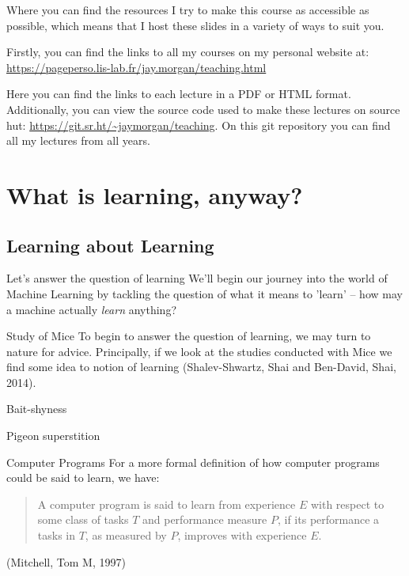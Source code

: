 \documentclass[10pt]{beamer}
\begin{document}
\begin{frame}[label={sec:org492f044}]{Where you can find the resources}
I try to make this course as accessible as possible, which means that I host these
slides in a variety of ways to suit you.

Firstly, you can find the links to all my courses on my personal website at:
\url{https://pageperso.lis-lab.fr/jay.morgan/teaching.html}

Here you can find the links to each lecture in a PDF or HTML format. Additionally,
you can view the source code used to make these lectures on source hut:
\url{https://git.sr.ht/\~jaymorgan/teaching}. On this git repository you can find all my
lectures from all years.
\end{frame}

\section*{What is learning, anyway?}
\label{sec:orgb1550be}

\subsection*{Learning about Learning}
\label{sec:org2c4e97d}

\begin{frame}[label={sec:org3b27963}]{Let's answer the question of learning}
We'll begin our journey into the world of Machine Learning by tackling the question
of what it means to 'learn' -- how may a machine actually \emph{learn} anything?
\end{frame}

\begin{frame}[label={sec:org7e0e479}]{Study of Mice}
To begin to answer the question of learning, we may turn to nature for
advice. Principally, if we look at the studies conducted with Mice we find some idea
to notion of learning (Shalev-Shwartz, Shai and Ben-David, Shai, 2014).
\end{frame}

\begin{frame}[label={sec:orgdc8692e}]{Bait-shyness}
\end{frame}

\begin{frame}[label={sec:org81625d8}]{Pigeon superstition}
\end{frame}

\begin{frame}[label={sec:org5b3cd2b}]{Computer Programs}
For a more formal definition of how computer programs could be said to learn, we have:

\begin{quote}
A computer program is said to learn from experience \(E\) with respect
to some class of tasks \(T\) and performance measure \(P\), if its performance
a tasks in \(T\), as measured by \(P\), improves with experience \(E\).
\end{quote}

(Mitchell, Tom M, 1997)
\end{frame}
\end{document}
